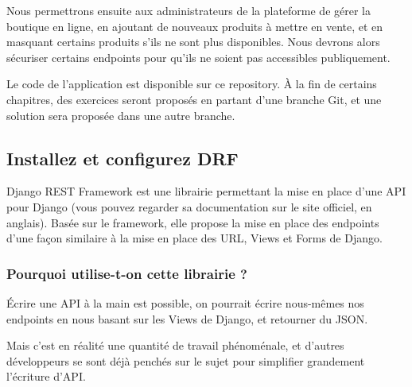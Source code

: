 Nous permettrons ensuite aux {\color{monOrange}administrateurs de la plateforme de gérer la boutique} en ligne, en ajoutant de nouveaux produits à mettre en vente, et en masquant certains produits s’ils ne sont plus disponibles. Nous devrons alors sécuriser certains endpoints pour qu’ils ne soient pas accessibles publiquement.

Le code de l’application est disponible sur ce repository. À la fin de certains chapitres, des exercices seront proposés en partant d’une branche {\color{monOrange}Git}, et une solution sera proposée dans une autre branche.
\subsection{Installez et configurez {\color{monOrange}DRF}}
Django REST Framework est une librairie permettant la mise en place d’une API pour Django (vous pouvez regarder sa documentation sur le site officiel, en anglais). Basée sur le framework, elle propose la mise en place des endpoints d’une façon similaire à la mise en place des URL, Views et Forms de Django.
\subsubsection*{Pourquoi utilise-t-on cette librairie ?}
Écrire une API à la main est possible, on pourrait écrire nous-mêmes nos endpoints en nous basant sur les Views de Django, et retourner du JSON.

Mais c’est en réalité une quantité de travail phénoménale, et d’autres développeurs se sont déjà penchés sur le sujet pour simplifier grandement l’écriture d’API.

